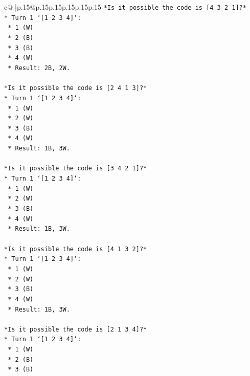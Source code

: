 \documentclass{article}
\begin{document}
{\begin{supertabular}{c@{$\;$}|p{.15\linewidth}@{}p{.15\linewidth}p{.15\linewidth}p{.15\linewidth}p{.15\linewidth}p{.15\linewidth}}
{{{\texttt{*Is it possible the code is {[}4 3 2 1{]}?*} \\
\texttt{*   Turn 1 `{[}1 2 3 4{]}`:} \\
\texttt{    *   1 (W)} \\
\texttt{    *   2 (B)} \\
\texttt{    *   3 (B)} \\
\texttt{    *   4 (W)} \\
\texttt{    *   Result: 2B, 2W.} \\
\\ 
\texttt{*Is it possible the code is {[}2 4 1 3{]}?*} \\
\texttt{*   Turn 1 `{[}1 2 3 4{]}`:} \\
\texttt{    *   1 (W)} \\
\texttt{    *   2 (W)} \\
\texttt{    *   3 (B)} \\
\texttt{    *   4 (W)} \\
\texttt{    *   Result: 1B, 3W.} \\
\\ 
\texttt{*Is it possible the code is {[}3 4 2 1{]}?*} \\
\texttt{*   Turn 1 `{[}1 2 3 4{]}`:} \\
\texttt{    *   1 (W)} \\
\texttt{    *   2 (W)} \\
\texttt{    *   3 (B)} \\
\texttt{    *   4 (W)} \\
\texttt{    *   Result: 1B, 3W.} \\
\\ 
\texttt{*Is it possible the code is {[}4 1 3 2{]}?*} \\
\texttt{*   Turn 1 `{[}1 2 3 4{]}`:} \\
\texttt{    *   1 (W)} \\
\texttt{    *   2 (W)} \\
\texttt{    *   3 (B)} \\
\texttt{    *   4 (W)} \\
\texttt{    *   Result: 1B, 3W.} \\
\\ 
\texttt{*Is it possible the code is {[}2 1 3 4{]}?*} \\
\texttt{*   Turn 1 `{[}1 2 3 4{]}`:} \\
\texttt{    *   1 (W)} \\
\texttt{    *   2 (B)} \\
\texttt{    *   3 (B)} \\
}}}
\end{supertabular}}
\end{document}
